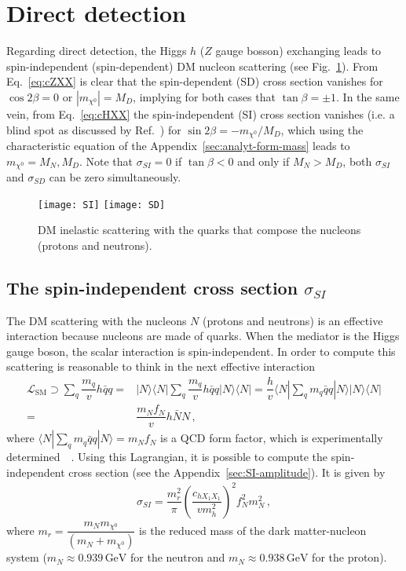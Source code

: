 \section{Direct detection}
Regarding direct detection, the Higgs $h$ ($Z$ gauge bosson) exchanging leads to spin-independent (spin-dependent) DM nucleon scattering (see Fig.~\ref{fig:SD_SI}). From Eq.~\eqref{eq:cZXX} is clear that the spin-dependent (SD) cross section vanishes for $\cos2\beta=0$ or $|m_{\chi^0}|=M_D$, implying for both cases that $\tan\beta=\pm 1$. In the same vein, from Eq.~\eqref{eq:cHXX} the spin-independent (SI) cross section vanishes (i.e. a blind spot as discussed by Ref.~\cite{Cheung:2013dua}) for $\sin2\beta=-m_{\chi^0}/M_D$, which using the characteristic equation of the Appendix~\eqref{sec:analyt-form-mass}
leads to $m_{\chi^0}=M_N, M_D$. Note that $\sigma_{SI}=0$ if $\tan\beta<0$ and only if $M_N>M_D$, both $\sigma_{SI}$ and $\sigma_{SD}$ can be zero simultaneously. 
%
\begin{figure}[h]
  \centering
  \texttt{[image: SI]} \texttt{[image: SD]}
  \caption{DM inelastic scattering with the quarks that compose the nucleons (protons and neutrons).}
  \label{fig:SD_SI}
\end{figure}









\subsection{The spin-independent cross section $\sigma_{SI}$}
%
The DM scattering with the nucleons $N$ (protons and neutrons) is an effective interaction because nucleons are made of quarks. When the mediator is the Higgs gauge boson, the scalar interaction is spin-independent. In order to compute this scattering is reasonable to think in the next effective interaction
%  
\begin{align}
\mathcal{L}_{\text{SM}}\supset \sum_{q}\dfrac{m_q}{v}h\bar{q}q
= & |N\rangle\langle N|\sum_{q}\dfrac{m_q}{v}h\bar{q}q |N\rangle\langle N|
=  \dfrac{h}{v}\langle N|\sum_{q}m_q\bar{q}q|N\rangle |N\rangle\langle N| \nonumber \\
= & \dfrac{m_Nf_N}{v}h\bar{N}N\,,
\end{align}
where $\langle N|\sum_{q}m_q\bar{q}q|N\rangle=m_Nf_N$ is a QCD form factor, which is experimentally determined~\cite{Belanger:2014vza}~\cite{Abdallah:2015ter}. Using this Lagrangian, it is possible to compute the spin-independent cross section (see the Appendix~\ref{sec:SI-amplitude}). It is given by
\begin{align}
\label{eq:SI-tree-level}
\sigma_{SI}=\dfrac{m_r^2}{\pi}\left(\dfrac{c_{hX_1X_1}}{vm_h^2}\right)^2f_N^2m_N^2\,,
\end{align}
%
where $m_r=\dfrac{m_Nm_{\chi^0}}{(m_N+m_{\chi^0})}$
is the reduced mass of the dark matter-nucleon system ($m_N\approx 0.939\, \text{GeV}$ for the neutron and $m_N\approx 0.938\, \text{GeV}$ for the proton). 

